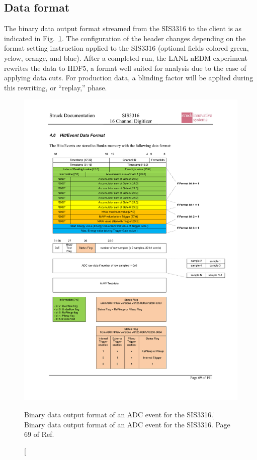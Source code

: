 
\subsection{Data format}\label{sec:sis3316_data_format}


The binary data output format streamed from the SIS3316 to the client is as indicated in Fig.~\ref{fig:sis3316_raw_data}. The configuration of the header changes depending on the format setting instruction applied to the SIS3316 (optional fields colored green, yelow, orange, and blue). After a completed run, the LANL nEDM experiment rewrites the data to HDF5, a format well suited for analysis due to the ease of applying data cuts. For production data, a blinding factor will be applied during this rewriting, or ``replay,'' phase. 


\begin{figure}
    \centering
    \includegraphics[height=0.9\textheight]{figures/sis3316_raw_data.pdf}
    \caption
    [Binary data output format of an ADC event for the SIS3316.]
     {Binary data output format of an ADC event for the SIS3316. Page 69 of Ref.~\cite{sis3316_manual}}
    \label{fig:sis3316_raw_data}
\end{figure}


